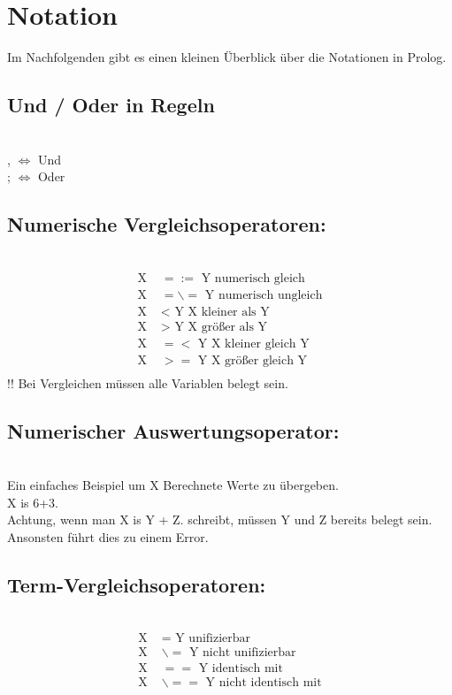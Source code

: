 \section{Notation}
Im Nachfolgenden gibt es einen kleinen Überblick über die Notationen in Prolog.
\subsection{Und / Oder in Regeln}\qquad\\
, $\Leftrightarrow$ Und\\
; $\Leftrightarrow$ Oder
\subsection{Numerische Vergleichsoperatoren:}\qquad\\
\begin{align*}
\text{X }   &=:=  \text{  Y    numerisch gleich}\\
\text{X }  &=\backslash= \text{  Y    numerisch ungleich}\\
\text{X }   &<\text{   Y    X kleiner als Y}\\
\text{X }   &>\text{   Y    X größer als Y}\\
\text{X }  &=<\text{   Y    X kleiner gleich Y}\\
\text{X }  &>= \text{  Y    X größer gleich Y}\\
\end{align*}
!! Bei Vergleichen müssen alle Variablen belegt sein.



\subsection{Numerischer Auswertungsoperator:}\qquad\\
Ein einfaches Beispiel um X Berechnete Werte zu übergeben. \\
X is 6+3.\\
Achtung, wenn man X is Y + Z. schreibt, müssen Y und Z bereits belegt sein. Ansonsten führt dies zu einem Error. 

\subsection{Term-Vergleichsoperatoren:}\qquad\\
\begin{align*}
\text{X }   &=   \text{ Y    unifizierbar}\\
\text{X }  &\backslash=   \text{ Y    nicht unifizierbar}\\
\text{X }  &==   \text{ Y    identisch mit}\\
\text{X }  &\backslash== \text{ Y    nicht identisch mit}\\
\end{align*}




